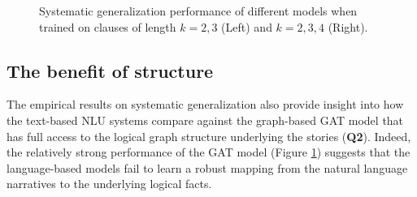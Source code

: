 \documentclass[letterpaper, 12pt]{report}
\begin{document}
\begin{figure}[!htb]
     \centering
    \qquad
    \hspace{-20pt}
    \caption{Systematic generalization performance of different models when trained on clauses of length $k=2,3$ (Left) and $k=2,3,4$ (Right).}
    \label{fig:gen_1}
\end{figure}



\subsection{The benefit of structure}
\label{sec:clutrr_structure}

The empirical results on systematic generalization also provide insight into how the text-based NLU systems compare against the graph-based GAT model that has full access to the logical graph structure underlying the stories (\textbf{Q2}).
Indeed, the relatively strong performance of the GAT model (Figure \ref{fig:gen_1}) suggests that the language-based models fail to learn a robust mapping from the natural language narratives to the underlying logical facts.
\end{document}
